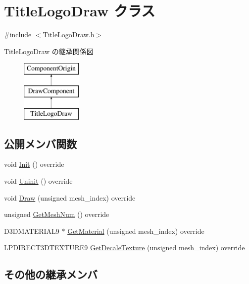 \hypertarget{class_title_logo_draw}{}\section{Title\+Logo\+Draw クラス}
\label{class_title_logo_draw}


{\ttfamily \#include $<$Title\+Logo\+Draw.\+h$>$}

Title\+Logo\+Draw の継承関係図\begin{figure}[H]
\begin{center}
\leavevmode
\includegraphics[height=3.000000cm]{class_title_logo_draw}
\end{center}
\end{figure}
\subsection*{公開メンバ関数}
\begin{DoxyCompactItemize}
\item 
void \mbox{\hyperlink{class_title_logo_draw_a9f70fb70639510908f4e07ee14667e30}{Init}} () override
\item 
void \mbox{\hyperlink{class_title_logo_draw_a07bbf9e8de5c7b9ee028408496c13c50}{Uninit}} () override
\item 
void \mbox{\hyperlink{class_title_logo_draw_a06917439520efba7319f254566f19b81}{Draw}} (unsigned mesh\+\_\+index) override
\item 
unsigned \mbox{\hyperlink{class_title_logo_draw_a882f0521f65845529e5bf45d3671d9c4}{Get\+Mesh\+Num}} () override
\item 
D3\+D\+M\+A\+T\+E\+R\+I\+A\+L9 $\ast$ \mbox{\hyperlink{class_title_logo_draw_a346a63d4c6464e5d7564117a3257ae40}{Get\+Material}} (unsigned mesh\+\_\+index) override
\item 
L\+P\+D\+I\+R\+E\+C\+T3\+D\+T\+E\+X\+T\+U\+R\+E9 \mbox{\hyperlink{class_title_logo_draw_adb7a5b8c8137e1bd3a3553c6045cefd0}{Get\+Decale\+Texture}} (unsigned mesh\+\_\+index) override
\end{DoxyCompactItemize}
\subsection*{その他の継承メンバ}


